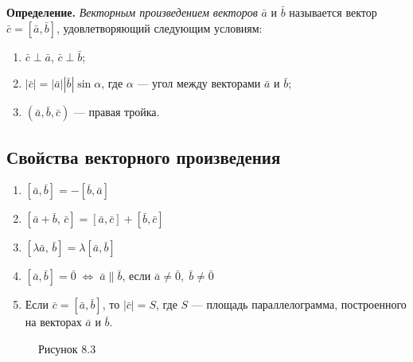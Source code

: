 \documentclass[12pt,a4paper]{article}
\newcommand{\va}{\bar{a}}
\newcommand{\vb}{\bar{b}}
\newcommand{\vc}{\bar{c}}
\begin{document}
\textbf{Определение.} \textit{Векторным произведением векторов} $\va$
и $\vb$ называется вектор $\vc = [\va, \vb]$, удовлетворяющий
следующим условиям:
\begin{enumerate}
  \item $\vc \perp \va$, $\vc \perp \vb$;
  \item $|\vc| = |\va||\vb|\sin\alpha$, где $\alpha$ --- угол между
    векторами $\va$ и $\vb$;
  \item $(\va, \vb, \vc)$ --- правая тройка.
\end{enumerate}

\subsection*{Свойства векторного произведения}

\begin{enumerate}
  \item $[\va, \vb] = -[\vb, \va]$
  \item $[\va + \vb,\, \vc] = [\va, \vc] + [\vb, \vc]$
  \item $[\lambda\va,\, \vb] = \lambda[\va, \vb]$
  \item $[\va, \vb] = \bar{0} \;\Leftrightarrow\; \va \parallel \vb$,
    если $\va \neq \bar{0},\; \vb \neq \bar{0}$
  \item Если $\vc = [\va, \vb]$, то $|\vc| = S$, где $S$ --- площадь
    параллелограмма, построенного на векторах $\va$ и $\vb$.
\end{enumerate}

\begin{figure}[h]
  \centering
  \caption*{Рисунок 8.3}
\end{figure}
\end{document}
